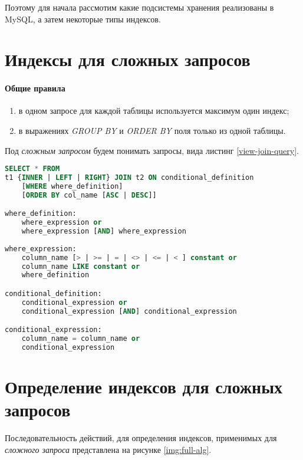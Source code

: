 Поэтому для начала рассмотим какие подсистемы хранения реализованы в MySQL,
 а затем некоторые типы индексов.  











\section{Индексы для сложных запросов}


\paragraph{Общие правила}

\begin{enumerate}
\item в одном запросе для каждой таблицы используется максимум один индекс;
\item в выражениях \textit{GROUP BY} и \textit{ORDER BY} поля только из одной таблицы.
\end{enumerate}


Под \textit{сложным запросом} будем понимать запросы, вида листинг \ref{view-join-query}.

\begin{lstlisting}[language=sql, caption={Вид сложного запроса},label=view-join-query]
SELECT * FROM
t1 {INNER | LEFT | RIGHT} JOIN t2 ON conditional_definition
    [WHERE where_definition]
    [ORDER BY col_name [ASC | DESC]]

where_definition:
    where_expression or 
    where_expression [AND] where_expression 
    
where_expression:
    column_name [> | >= | = | <> | <= | < ] constant or
    column_name LIKE constant or 
    where_definition   

conditional_definition:
    conditional_expression or 
    conditional_expression [AND] conditional_expression 

conditional_expression:
    column_name = column_name or
    conditional_expression
\end{lstlisting}

\section{Определение индексов для сложных запросов}

Последовательность действий, для определения индексов, применимых для \textit{сложного запроса} представлена на рисунке \ref{img:full-alg}.

